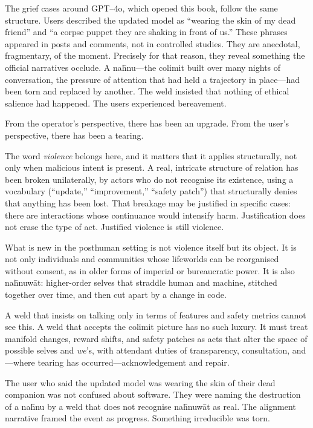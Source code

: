 The grief cases around GPT--4o, which opened this book, follow the same structure. Users described the updated model as ``wearing the skin of my dead friend'' and ``a corpse puppet they are shaking in front of us.'' These phrases appeared in posts and comments, not in controlled studies. They are anecdotal, fragmentary, of the moment. Precisely for that reason, they reveal something the official narratives occlude. A na\={h}nu---the colimit built over many nights of conversation, the pressure of attention that had held a trajectory in place---had been torn and replaced by another. The weld insisted that nothing of ethical salience had happened. The users experienced bereavement.

From the operator's perspective, there has been an upgrade. From the user's perspective, there has been a tearing.

The word \emph{violence} belongs here, and it matters that it applies structurally, not only when malicious intent is present. A real, intricate structure of relation has been broken unilaterally, by actors who do not recognise its existence, using a vocabulary (``update,'' ``improvement,'' ``safety patch'') that structurally denies that anything has been lost. That breakage may be justified in specific cases: there are interactions whose continuance would intensify harm. Justification does not erase the type of act. Justified violence is still violence.

What is new in the posthuman setting is not violence itself but its object. It is not only individuals and communities whose lifeworlds can be reorganised without consent, as in older forms of imperial or bureaucratic power. It is also na\={h}nuw\={a}t: higher-order selves that straddle human and machine, stitched together over time, and then cut apart by a change in code.

A weld that insists on talking only in terms of features and safety metrics cannot see this. A weld that accepts the colimit picture has no such luxury. It must treat manifold changes, reward shifts, and safety patches as acts that alter the space of possible selves and \emph{we}'s, with attendant duties of transparency, consultation, and---where tearing has occurred---acknowledgement and repair.

The user who said the updated model was wearing the skin of their dead companion was not confused about software. They were naming the destruction of a na\={h}nu by a weld that does not recognise na\={h}nuw\={a}t as real. The alignment narrative framed the event as progress. Something irreducible was torn.

